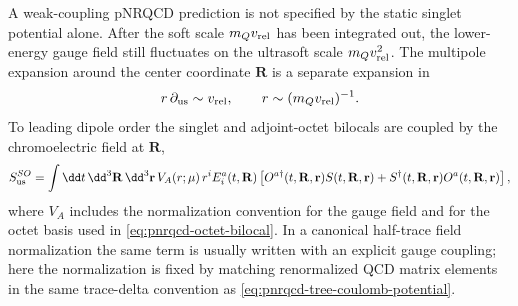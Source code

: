 \begin{controlledapproximation}
\label{ca:qcd-pnrqcd-ultrasoft-dipole-window}
A weak-coupling pNRQCD prediction is not specified by the static singlet
potential alone.  After the soft scale \(m_Qv_{\rm rel}\) has been integrated
out, the lower-energy gauge field still fluctuates on the ultrasoft scale
\(m_Qv_{\rm rel}^2\).  The multipole expansion around the center coordinate
\(\mathbf R\) is a separate expansion in
\[
  r\,\partial_{\rm us}\sim v_{\rm rel},
  \qquad r\sim (m_Qv_{\rm rel})^{-1}.
\]
To leading dipole order the singlet and adjoint-octet bilocals are coupled by
the chromoelectric field at \(\mathbf R\),
\begin{equation}
  S_{\rm us}^{SO}
  =
  \int \dd t\,\dd^3\mathbf R\,\dd^3\mathbf r\,
  V_A(r;\mu)\,
  r^i E_i^a(t,\mathbf R)
  \left[O^{a\dagger}(t,\mathbf R,\mathbf r)S(t,\mathbf R,\mathbf r)
  +S^\dagger(t,\mathbf R,\mathbf r)O^a(t,\mathbf R,\mathbf r)\right],
  \label{eq:qcd-pnrqcd-ultrasoft-dipole-coupling}
\end{equation}
where \(V_A\) includes the normalization convention for the gauge field and
for the octet basis used in \eqref{eq:pnrqcd-octet-bilocal}.  In a canonical
half-trace field normalization the same term is usually written with an
explicit gauge coupling; here the normalization is fixed by matching
renormalized QCD matrix elements in the same trace-delta convention as
\eqref{eq:pnrqcd-tree-coulomb-potential}.


\end{controlledapproximation}
